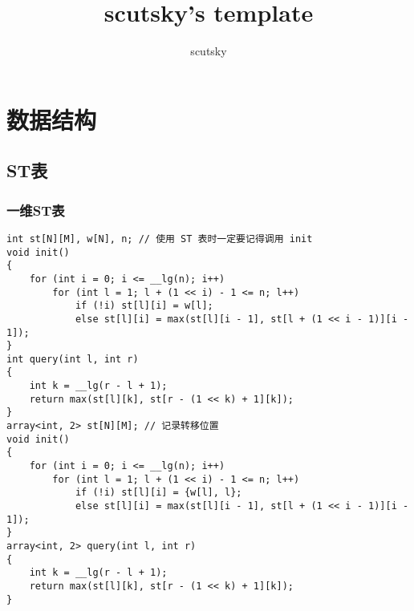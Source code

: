 \documentclass[a4paper,fontset=none]{ctexart}
\title{scutsky's template}
\author{scutsky}
\date{}
\begin{document}
\small
\begin{titlepage}
\maketitle
\end{titlepage}

\newpage
\pagestyle{empty}
\renewcommand{\contentsname}{目录}
\tableofcontents %
\newpage\clearpage
\newpage
\pagestyle{fancy}
\setcounter{page}{1}   %

\section{数据结构}
\subsection{ST表}
\subsubsection{一维ST表}
\begin{verbatim}
int st[N][M], w[N], n; // 使用 ST 表时一定要记得调用 init
void init()
{
    for (int i = 0; i <= __lg(n); i++)
        for (int l = 1; l + (1 << i) - 1 <= n; l++)
            if (!i) st[l][i] = w[l];
            else st[l][i] = max(st[l][i - 1], st[l + (1 << i - 1)][i - 1]);
}
int query(int l, int r)
{
    int k = __lg(r - l + 1);
    return max(st[l][k], st[r - (1 << k) + 1][k]);
}
array<int, 2> st[N][M]; // 记录转移位置
void init()
{
    for (int i = 0; i <= __lg(n); i++)
        for (int l = 1; l + (1 << i) - 1 <= n; l++)
            if (!i) st[l][i] = {w[l], l};
            else st[l][i] = max(st[l][i - 1], st[l + (1 << i - 1)][i - 1]);
}
array<int, 2> query(int l, int r)
{
    int k = __lg(r - l + 1);
    return max(st[l][k], st[r - (1 << k) + 1][k]);
}
\end{verbatim}
\end{document}
